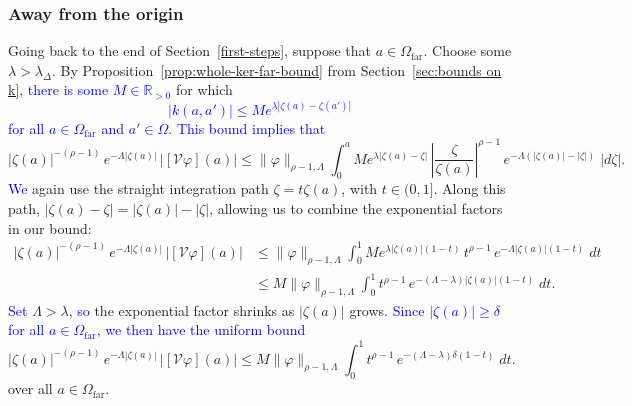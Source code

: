\documentclass[review]{siamart220329}
\newcommand{\R}{\mathbb{R}}
\newcommand{\volterra}{\mathcal{V}}
\newcommand{\far}{\Omega_\text{far}}
\begin{document}
\subsubsection{Away from the origin}\label{far-bound}
Going back to the end of Section~\ref{first-steps}, suppose that $a \in \far$. Choose some $\lambda > \lambda_\Delta$. By Proposition~\ref{prop:whole-ker-far-bound} from Section~\ref{sec:bounds on k}, \textcolor{blue}{there is some $M\in\R_{>0}$} for which
\textcolor{blue}{\[ |k(a, a')| \le M e^{\lambda |\zeta(a) - \zeta(a')|} \]}
\textcolor{blue}{for all $a \in \far$ and $a' \in \Omega$.} \textcolor{blue}{This bound implies that}
\[ |\zeta(a)|^{-(\rho-1)}\,e^{-\Lambda|\zeta(a)|}\,|[\volterra\varphi](a)| \le \|\varphi\|_{\rho-1, \Lambda} \int_0^a M e^{\lambda |\zeta(a) - \zeta|}\,\left|\frac{\zeta}{\zeta(a)}\right|^{\rho-1}\,e^{-\Lambda(|\zeta(a)| - |\zeta|)}\;|d\zeta|. \]
\textcolor{blue}{We} again use the straight integration path $\zeta = t \zeta(a)$, with $t \in (0, 1]$. Along this path, $|\zeta(a) - \zeta| = |\zeta(a)| - |\zeta|$, allowing us to combine the exponential factors in our bound:
\begin{align*}
|\zeta(a)|^{-(\rho-1)}\,e^{-\Lambda|\zeta(a)|}\,|[\volterra\varphi](a)| & \le \|\varphi\|_{\rho-1, \Lambda} \int_0^1 M e^{\lambda |\zeta(a)|(1 - t)}\,t^{\rho-1}\,e^{-\Lambda |\zeta(a)|(1 - t)}\;dt \\
& \le M \|\varphi\|_{\rho-1, \Lambda} \int_0^1 t^{\rho-1}\,e^{-(\Lambda - \lambda)|\zeta(a)|(1 - t)}\;dt.
\end{align*}
\textcolor{blue}{Set} $\Lambda > \lambda$, \textcolor{blue}{so} the exponential factor shrinks as $|\zeta(a)|$ grows. \textcolor{blue}{Since $|\zeta(a)| \ge \delta$ for all $a \in \far$, we then have the uniform bound}
\[ |\zeta(a)|^{-(\rho-1)}\,e^{-\Lambda|\zeta(a)|}\,|[\volterra\varphi](a)| \le M \|\varphi\|_{\rho-1, \Lambda} \int_0^1 t^{\rho-1}\,e^{-(\Lambda - \lambda)\delta(1 - t)}\;dt. \]
over all $a \in \far$.
\end{document}
